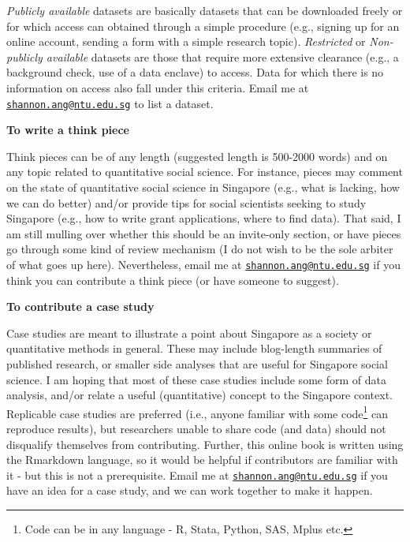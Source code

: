 \documentclass[
  openany]{book}
\begin{document}
\emph{Publicly available} datasets are basically datasets that can be downloaded freely or for which access can obtained through a simple procedure (e.g., signing up for an online account, sending a form with a simple research topic). \emph{Restricted} or \emph{Non-publicly available} datasets are those that require more extensive clearance (e.g., a background check, use of a data enclave) to access. Data for which there is no information on access also fall under this criteria. Email me at \href{mailto:shannon.ang@ntu.edu.sg}{\nolinkurl{shannon.ang@ntu.edu.sg}} to list a dataset.

\textbf{To write a think piece}

Think pieces can be of any length (suggested length is 500-2000 words) and on any topic related to quantitative social science. For instance, pieces may comment on the state of quantitative social science in Singapore (e.g., what is lacking, how we can do better) and/or provide tips for social scientists seeking to study Singapore (e.g., how to write grant applications, where to find data). That said, I am still mulling over whether this should be an invite-only section, or have pieces go through some kind of review mechanism (I do not wish to be the sole arbiter of what goes up here). Nevertheless, email me at \href{mailto:shannon.ang@ntu.edu.sg}{\nolinkurl{shannon.ang@ntu.edu.sg}} if you think you can contribute a think piece (or have someone to suggest).

\textbf{To contribute a case study}

Case studies are meant to illustrate a point about Singapore as a society or quantitative methods in general. These may include blog-length summaries of published research, or smaller side analyses that are useful for Singapore social science. I am hoping that most of these case studies include some form of data analysis, and/or relate a useful (quantitative) concept to the Singapore context. Replicable case studies are preferred (i.e., anyone familiar with some code\footnote{Code can be in any language - R, Stata, Python, SAS, Mplus etc.} can reproduce results), but researchers unable to share code (and data) should not disqualify themselves from contributing. Further, this online book is written using the Rmarkdown language, so it would be helpful if contributors are familiar with it - but this is not a prerequisite. Email me at \href{mailto:shannon.ang@ntu.edu.sg}{\nolinkurl{shannon.ang@ntu.edu.sg}} if you have an idea for a case study, and we can work together to make it happen.
\end{document}
